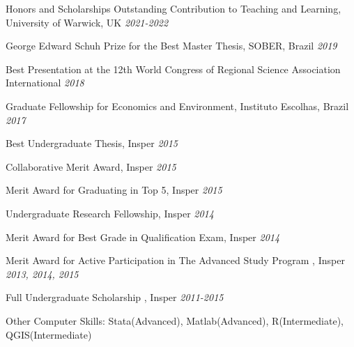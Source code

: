 \documentclass{resume} %
\begin{document}
\pagebreak

\begin{rSection}{Honors and Scholarships}
{Outstanding Contribution to Teaching and Learning, University of Warwick, UK} \hfill {\em 2021-2022} 

{George Edward Schuh Prize for the Best Master Thesis, SOBER, Brazil} \hfill {\em 2019} 

{Best Presentation at the 12th World Congress of Regional Science Association International} \hfill {\em 2018} 

{Graduate Fellowship for Economics and Environment, Instituto Escolhas, Brazil} \hfill {\em 2017} 

{Best Undergraduate Thesis, Insper} \hfill {\em 2015}  

{Collaborative Merit Award, Insper} \hfill {\em 2015}  

{Merit Award for Graduating in Top 5, Insper} \hfill {\em 2015}  

{Undergraduate Research Fellowship, Insper} \hfill {\em 2014}  

{Merit Award for Best Grade in Qualification Exam, Insper} \hfill {\em 2014}  

{Merit Award for Active Participation in The Advanced Study Program , Insper} \hfill {\em 2013, 2014, 2015}  

{Full Undergraduate Scholarship , Insper} \hfill {\em 2011-2015}  
\end{rSection}





\begin{rSection}{Other}
{Computer Skills: Stata(Advanced), Matlab(Advanced), R(Intermediate), QGIS(Intermediate)}
\end{rSection}
\end{document}
